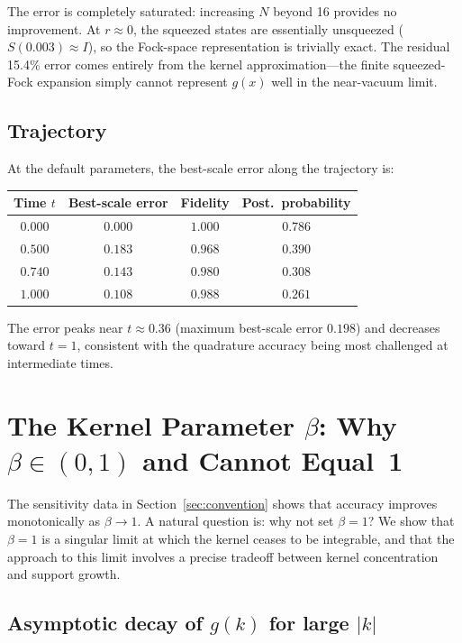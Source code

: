 \documentclass[11pt]{article}
\begin{document}
The error is completely saturated: increasing $N$ beyond 16 provides no
improvement.  At $r \approx 0$, the squeezed states are essentially
unsqueezed ($S(0.003) \approx I$), so the Fock-space representation is
trivially exact.  The residual 15.4\% error comes entirely from the
kernel approximation---the finite squeezed-Fock expansion simply cannot
represent $g(x)$ well in the near-vacuum limit.

\subsection{Trajectory}

At the default parameters, the best-scale error along the trajectory is:

\begin{center}
\begin{tabular}{cccc}
  \toprule
  Time $t$ & Best-scale error & Fidelity & Post.\ probability \\
  \midrule
  $0.000$ & $0.000$ & $1.000$ & $0.786$ \\
  $0.500$ & $0.183$ & $0.968$ & $0.390$ \\
  $0.740$ & $0.143$ & $0.980$ & $0.308$ \\
  $1.000$ & $0.108$ & $0.988$ & $0.261$ \\
  \bottomrule
\end{tabular}
\end{center}

The error peaks near $t \approx 0.36$ (maximum best-scale error $0.198$)
and decreases toward $t = 1$, consistent with the quadrature accuracy
being most challenged at intermediate times.

\section{The Kernel Parameter $\beta$: Why $\beta \in (0,1)$ and Cannot Equal~1}\label{sec:beta}

The sensitivity data in Section~\ref{sec:convention} shows that accuracy
improves monotonically as $\beta \to 1$.  A natural question is: why not
set $\beta = 1$?  We show that $\beta = 1$ is a singular limit at which
the kernel ceases to be integrable, and that the approach to this limit
involves a precise tradeoff between kernel concentration and support
growth.

\subsection{Asymptotic decay of $g(k)$ for large $|k|$}
\end{document}
